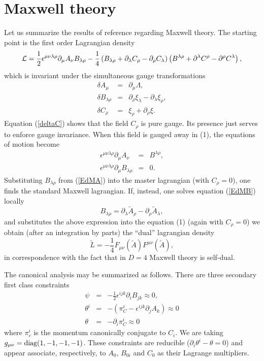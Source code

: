 \documentclass[a4paper,12pt]{article}
\newcommand{\eref}[1]{(\ref{#1})}
\begin{document}
\section{Maxwell theory}\label{sec2}
  Let us summarize the results of reference\cite{LL} regarding Maxwell
theory. The starting point is the first order Lagrangian density
\begin{equation}
{\cal L}=\frac 12\epsilon^{\mu\nu\lambda\rho}\partial_\mu A_\nu
B_{\lambda\rho}-\frac 14\left(B_{\lambda\rho}+\partial_\lambda
C_\rho-\partial_\rho C_\lambda\right)\left(B^{\lambda\rho}+\partial^\lambda
C^\rho-\partial^\rho C^\lambda\right),
\end{equation}
which is invariant under the simultaneous gauge transformations
\begin{eqnarray}
\delta A_\mu&=&\partial_\mu\Lambda,\\
\delta B_{\lambda\rho}&=&\partial_\rho\xi_\lambda-\partial_\lambda\xi_\rho,
\\
\delta C_\rho&=&\xi_\rho + \partial_\rho\xi.\label{deltaC}
\end{eqnarray}
Equation \eref{deltaC} shows that the field $C_\rho$ is pure
gauge. Its presence just serves to enforce gauge invariance. When
this field is gauged away in (1), the equations of motion become
\begin{eqnarray}
\epsilon^{\mu\nu\lambda\rho}\partial_\mu A_\nu&=&B^{\lambda\rho},\label{EdMA}\\
\epsilon^{\mu\nu\lambda\rho}\partial_\mu B_{\lambda\rho}&=&0.\label{EdMB}
\end{eqnarray}
Substituting $B_{\lambda\rho}$ from \eref{EdMA} into the master lagrangian
(with $C_\rho=0$), one finds the standard Maxwell lagrangian. If, instead,
one solves equation \eref{EdMB} locally
\begin{equation}
B_{\lambda\rho}=\partial_\lambda\tilde A_\rho-\partial_\rho\tilde
A_\lambda,
\end{equation}
and substitutes the above expression into the equation (1) (again with $C_\rho=0$)
we obtain (after an integration by parts) the ``dual'' lagrangian density
\begin{equation}
\tilde L=-\frac 14 F_{\mu\nu}(\tilde A) F^{\mu\nu}(\tilde A),
\end{equation}
in correspondence with the fact that in $D=4$ Maxwell theory is self-dual.

The canonical analysis may be summarized as follows. There are
three secondary first class constraints
\begin{eqnarray}
\psi&=&-\frac 12 \epsilon^{ijk}\partial_i B_{jk}\approx0,\label{ligadura1}\\
\theta^i&=&-(\pi_C^i-\epsilon^{ijk}\partial_j A_k)\approx0\label{ligadura2}\\
\theta&=&-\partial_i\pi_C^i\approx0\label{ligadura3}
\end{eqnarray}
where $\pi_c^i$ is the momentum canonically conjugate to $C_i$.
We are taking $g_{\mu\nu} = \hbox{diag}(1,-1,-1,-1)$. These constraints
are reducible ($\partial_i\theta^i-\theta=0$) and appear
associate, respectively, to $A_0$, $B_{0i}$ and $C_0$ as their
Lagrange multipliers.
\end{document}
